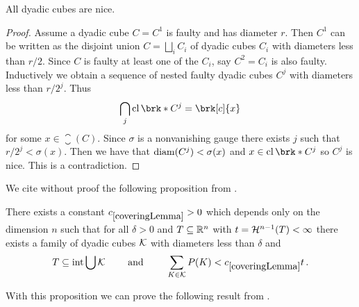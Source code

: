 \begin{lemma}[Cousin]\label{le:Cousin}
All dyadic cubes are nice.
\end{lemma}
\begin{proof}
Assume a dyadic cube $C=C^1$ is faulty and has diameter $r$. Then $C^1$ can be written as the disjoint union $C=\bigsqcup_iC_i$ of dyadic cubes $C_i$ with diameters less than $r/2$. Since $C$ is faulty at least one of the $C_i$, say $C^2=C_i$ is also faulty. Inductively we obtain a sequence of nested faulty dyadic cubes $C^j$ with diameters less than $r/2^j$. Thus
\begin{align*}
	\bigcap_j\closure\brk*{C^j}=\brk[c]{x}
\end{align*}
for some $x\in \closure(C)$. Since $\sigma$ is a nonvanishing gauge there exists $j$ such that $r/2^j<\sigma(x)$. Then we have that $\operatorname{diam}(C^j)<\sigma(x)$ and $x\in \closure\brk*{C^j}$ so $C^j$ is nice. This is a contradiction.
\end{proof}

We cite without proof the following proposition from \cite[Lemma 1.3.2]{Pfe2001}.
\begin{proposition}\label{pr:coveringLemma}
There exists a constant $\useconstant{coveringLemma}>0$ which depends only on the dimension $n$ such that for all $\delta>0$ and $T\subseteq\mathbb{R}^n$ with $t=\mathcal{H}^{n-1}(T)<\infty$  there exists a family of dyadic cubes $\mathcal{K}$ with diameters less than $\delta$ and
\begin{align*}
	T\subseteq\interior\bigcup\cK \qquad\text{ and }\qquad\sum_{K\in\cK}P(K)<\useconstant{coveringLemma} t\,.
\end{align*}
\end{proposition}

\noindent With this proposition we can prove the following result from \cite[Lemma 2.6.4]{Pfe2001}.

